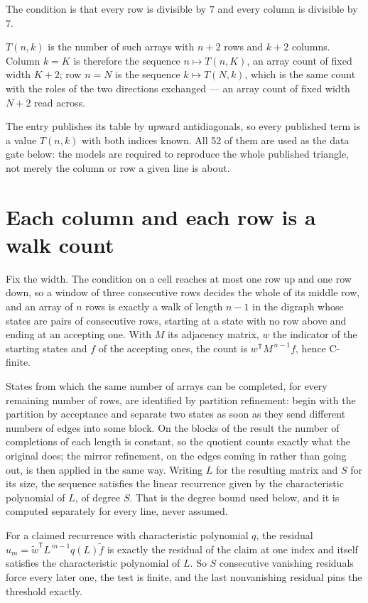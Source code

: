 \documentclass[11pt]{article}
\theoremstyle{definition}
\begin{document}
The condition is that every row is divisible by $7$ and every column is divisible by $7$.

$T(n,k)$ is the number of such arrays with $n + 2$ rows and $k + 2$ columns. Column $k = K$ is therefore the sequence $n \mapsto T(n,K)$, an array count of fixed width $K + 2$; row $n = N$ is the sequence $k \mapsto T(N,k)$, which is the same count with the roles of the two directions exchanged --- an array count of fixed width $N + 2$ read across.

The entry publishes its table by upward antidiagonals, so every published term is a value $T(n,k)$ with both indices known. All 52 of them are used as the data gate below: the models are required to reproduce the whole published triangle, not merely the column or row a given line is about.

\section{Each column and each row is a walk count}

Fix the width. The condition on a cell reaches at most one row up and one row down, so a window of three consecutive rows decides the whole of its middle row, and an array of $n$ rows is exactly a walk of length $n-1$ in the digraph whose states are pairs of consecutive rows, starting at a state with no row above and ending at an accepting one. With $M$ its adjacency matrix, $w$ the indicator of the starting states and $f$ of the accepting ones, the count is $w^{\mathsf T}M^{\,n-1}f$, hence C-finite.

States from which the same number of arrays can be completed, for every remaining number of rows, are identified by partition refinement: begin with the partition by acceptance and separate two states as soon as they send different numbers of edges into some block. On the blocks of the result the number of completions of each length is constant, so the quotient counts exactly what the original does; the mirror refinement, on the edges coming in rather than going out, is then applied in the same way. Writing $L$ for the resulting matrix and $S$ for its size, the sequence satisfies the linear recurrence given by the characteristic polynomial of $L$, of degree $S$. That is the degree bound used below, and it is computed separately for every line, never assumed.

For a claimed recurrence with characteristic polynomial $q$, the residual $u_m = \tilde w^{\mathsf T}L^{\,m-1}q(L)\tilde f$ is exactly the residual of the claim at one index and itself satisfies the characteristic polynomial of $L$. So $S$ consecutive vanishing residuals force every later one, the test is finite, and the last nonvanishing residual pins the threshold exactly.
\end{document}
